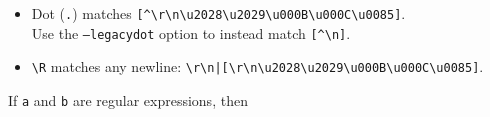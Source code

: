 \documentclass[11pt]{scrartcl}
\begin{document}
\begin{itemize}
\begin{itemize}
    To refer to a Unicode Property, use the \verb+\p{...}+ syntax, e.g. the
    Greek Block can be referred to as \verb+\p{Block:Greek}+. To match the
    all characters not included in a property, use the \verb+\P{...}+ syntax
    (note that the '\verb+P+' is uppercase), e.g. to match all characters
    that are {\bf not} letters: \verb+\P{Letter}+.
     
    See UTS\#18 \cite{unicode_rep} for a description of and links to
    definitions of some supported Properties. UnicodeSet \cite{UnicodeSet}
    is an online utility to show the character sets corresponding to
    Unicode Properties and set operations on them, but only for the most
    recent Unicode version.

  \item
    Dot (\texttt{.}) matches \verb+[^\r\n\u2028\u2029\u000B\u000C\u0085]+.\\
    Use the \texttt{--legacydot} option to instead match \verb+[^\n]+.
    
  \item
    \verb+\R+ matches any newline: \verb+\r\n|[\r\n\u2028\u2029\u000B\u000C\u0085]+.
  
  \end{itemize}

\end{itemize}

    If \texttt{a} and \texttt{b} are regular expressions, then
\end{document}
